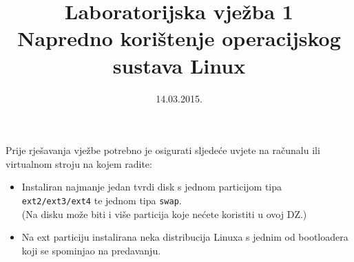\documentclass[12pt,a4paper]{article}
\begin{document}
	\title{Laboratorijska vježba 1\\{\large Napredno korištenje operacijskog sustava Linux}}
	\date{\vspace{-5ex} 14.03.2015.}
   \maketitle
    Prije rješavanja vježbe potrebno je osigurati sljedeće uvjete na računalu ili virtualnom stroju na kojem radite:
    
    \begin{itemize}
        \item Instaliran najmanje jedan tvrdi disk s jednom particijom tipa \texttt{ext2/ext3/ext4} te jednom tipa \texttt{swap}.\\ {\small (Na disku može biti i više  particija koje nećete koristiti u ovoj DZ.)}
        \item Na ext particiju instalirana neka distribucija Linuxa s jednim od bootloadera koji se spominjao na predavanju.
    \end{itemize}
\end{document}
